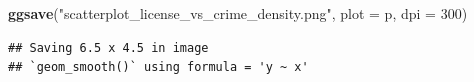 \documentclass[
  landscape]{article}
\newenvironment{Shaded}{\begin{snugshade}}{\end{snugshade}}
\newcommand{\AttributeTok}[1]{\textcolor[rgb]{0.13,0.29,0.53}{#1}}
\newcommand{\DecValTok}[1]{\textcolor[rgb]{0.00,0.00,0.81}{#1}}
\newcommand{\FunctionTok}[1]{\textcolor[rgb]{0.13,0.29,0.53}{\textbf{#1}}}
\newcommand{\NormalTok}[1]{#1}
\newcommand{\StringTok}[1]{\textcolor[rgb]{0.31,0.60,0.02}{#1}}
\begin{document}
\begin{Shaded}
\begin{Highlighting}[]
\FunctionTok{ggsave}\NormalTok{(}\StringTok{"scatterplot\_license\_vs\_crime\_density.png"}\NormalTok{, }\AttributeTok{plot =}\NormalTok{ p, }\AttributeTok{dpi =} \DecValTok{300}\NormalTok{)}
\end{Highlighting}
\end{Shaded}

\begin{verbatim}
## Saving 6.5 x 4.5 in image
## `geom_smooth()` using formula = 'y ~ x'
\end{verbatim}
\end{document}
